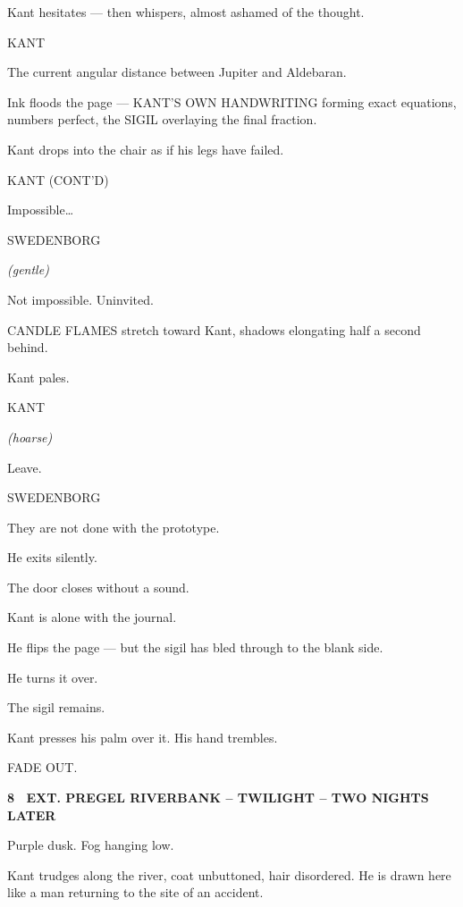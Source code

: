 \documentclass[12pt]{article}
\newcommand{\scene}[2]{%
  \vspace{1.8\baselineskip}%
  \noindent\textbf{#1 \ #2}\par\vspace{0.4\baselineskip}%
}
\newenvironment{dialogue}[1]{%
  \vspace{0.8\baselineskip}%
  \noindent\hspace*{2.3in}\textsc{#1}\par%
  \noindent\hspace*{1.5in}\begin{minipage}[t]{4.5in}%
}{%
  \end{minipage}\par%
}
\newcommand{\paren}[1]{%
  \noindent\hspace*{1.8in}\textit{(#1)}\par%
}
\newcommand{\centered}[1]{%
  \vspace{0.8\baselineskip}%
  \begin{center}#1\end{center}%
}
\begin{document}
Kant hesitates --- then whispers, almost ashamed of the thought.

\begin{dialogue}{KANT}
The current angular distance between Jupiter and Aldebaran.
\end{dialogue}

Ink floods the page --- KANT'S OWN HANDWRITING forming exact equations,
numbers perfect, the SIGIL overlaying the final fraction.

Kant drops into the chair as if his legs have failed.

\begin{dialogue}{KANT (CONT'D)}
Impossible\ldots
\end{dialogue}

\begin{dialogue}{SWEDENBORG}
\paren{gentle}
Not impossible. Uninvited.
\end{dialogue}

CANDLE FLAMES stretch toward Kant, shadows elongating half a second
behind.

Kant pales.

\begin{dialogue}{KANT}
\paren{hoarse}
Leave.
\end{dialogue}

\begin{dialogue}{SWEDENBORG}
They are not done with the prototype.
\end{dialogue}

He exits silently.

The door closes without a sound.

Kant is alone with the journal.

He flips the page --- but the sigil has bled through to the blank side.

He turns it over.

The sigil remains.

Kant presses his palm over it. His hand trembles.

\centered{FADE OUT.}


\scene{8}{EXT. PREGEL RIVERBANK -- TWILIGHT -- TWO NIGHTS LATER}

Purple dusk. Fog hanging low.

Kant trudges along the river, coat unbuttoned, hair disordered. He is
drawn here like a man returning to the site of an accident.
\end{document}
